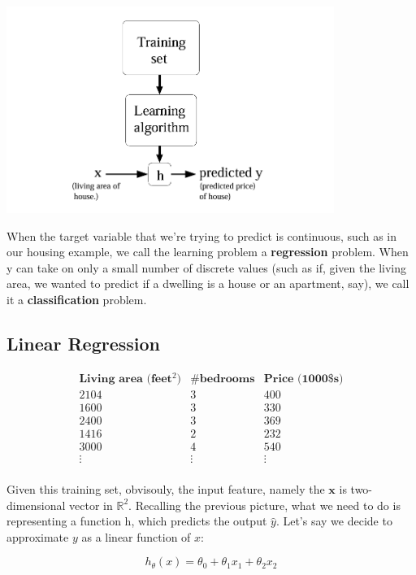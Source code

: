 \documentclass[fontset=windows,pass]{article}
\numberwithin{equation}{subsection} %
\begin{document}
\begin{center}
	\includegraphics[width = 0.8\textwidth]{Figures/Supervised_Method.png}
\end{center}

When the target variable that we're trying to predict is continuous, such as in our housing example, 
we call the learning problem a \textbf{regression} problem. When y can take on only a small number of discrete values 
(such as if, given the living area, we wanted to predict if a dwelling is a house or an
 apartment, say), we call it a \textbf{classification} problem.

\subsection{Linear Regression}

\[
\begin{array}{c|c|c}
\textbf{Living area (feet$^2$)} & \textbf{\#bedrooms} & \textbf{Price (1000\$s)} \\
\hline
2104 & 3 & 400 \\
1600 & 3 & 330 \\
2400 & 3 & 369 \\
1416 & 2 & 232 \\
3000 & 4 & 540 \\
\vdots & \vdots & \vdots \\
\end{array}
\]

Given this training set, obvisouly, the input feature, namely the $\boldsymbol{x}$ is two-dimensional vector
in $\mathbb{R}^2$. Recalling the previous picture, what we need to do is representing a function
h, which predicts the output $\hat{y}$. Let's say we decide to approximate $y$ as a linear function of $x$:

\begin{equation}
	h_\theta(x) = \theta_0 + \theta_1 x_1 + \theta_2 x_2
\end{equation}
\end{document}
